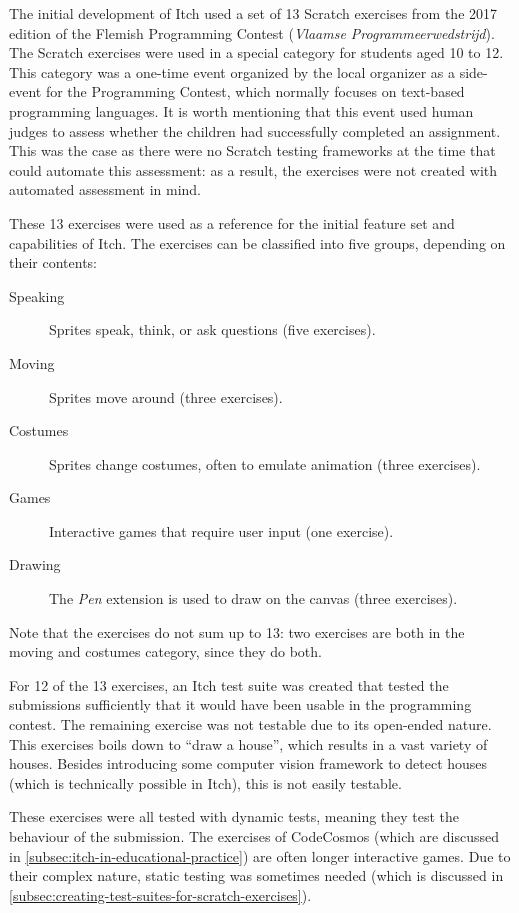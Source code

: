 \documentclass[../main]{subfiles}
\begin{document}
The initial development of Itch used a set of 13 Scratch exercises from the 2017 edition of the Flemish Programming Contest (\textdutch{\emph{Vlaamse Programmeerwedstrijd}}).
The Scratch exercises were used in a special category for students aged 10 to 12.
This category was a one-time event organized by the local organizer as a side-event for the Programming Contest, which normally focuses on text-based programming languages.
It is worth mentioning that this event used human judges to assess whether the children had successfully completed an assignment.
This was the case as there were no Scratch testing frameworks at the time that could automate this assessment: as a result, the exercises were not created with automated assessment in mind.

These 13 exercises were used as a reference for the initial feature set and capabilities of Itch.
The exercises can be classified into five groups, depending on their contents:

\begin{description}
    \item[Speaking] Sprites speak, think, or ask questions (five exercises).
    \item[Moving] Sprites move around (three exercises).
    \item[Costumes] Sprites change costumes, often to emulate animation (three exercises).
    \item[Games] Interactive games that require user input (one exercise).
    \item[Drawing] The \emph{Pen} extension is used to draw on the canvas (three exercises).
\end{description}

Note that the exercises do not sum up to 13: two exercises are both in the moving and costumes category, since they do both.

For 12 of the 13 exercises, an Itch test suite was created that tested the submissions sufficiently that it would have been usable in the programming contest.
The remaining exercise was not testable due to its open-ended nature.
This exercises boils down to ``draw a house'', which results in a vast variety of houses.
Besides introducing some computer vision framework to detect houses (which is technically possible in Itch), this is not easily testable.

These exercises were all tested with dynamic tests, meaning they test the behaviour of the submission.
The exercises of CodeCosmos (which are discussed in \cref{subsec:itch-in-educational-practice}) are often longer interactive games.
Due to their complex nature, static testing was sometimes needed (which is discussed in \cref{subsec:creating-test-suites-for-scratch-exercises}).
\end{document}
